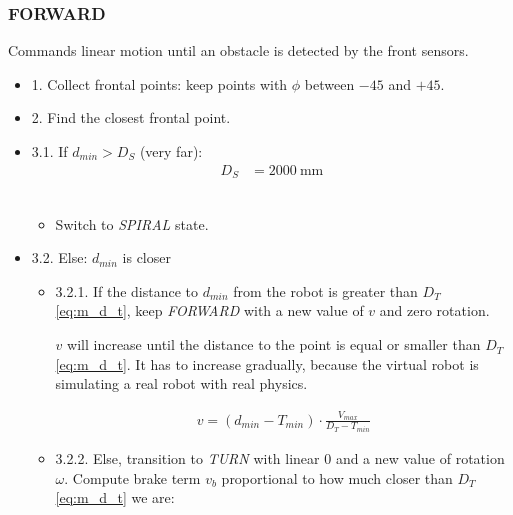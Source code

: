 \documentclass[conference]{IEEEtran}
\begin{document}
\subsubsection{FORWARD} Commands linear motion until an obstacle is detected by the front sensors.
\begin{itemize}
    \item 1. Collect frontal points: keep points with $\phi$ between $-45$\textdegree{} and $+45$\textdegree{}.
    \item 2. Find the closest frontal point.
    \item 3.1. If $d_{min} > D_S$ (very far):
    \begin{align}
        D_S &= 2000 \ \text{mm}
    \end{align} 
    \begin{itemize}
        \item Switch to \textit{SPIRAL} state.
    \end{itemize}
    \item 3.2. Else: $d_{min}$ is closer
    \begin{itemize}
        \item 3.2.1. If the distance to $d_{min}$ from the robot is greater than $D_T$ \eqref{eq:m_d_t}, keep \textit{FORWARD} with a new value of $v$ and zero rotation.

        $v$ will increase until the distance to the point is equal or smaller than $D_T$ \eqref{eq:m_d_t}. It has to increase gradually, because the virtual robot is simulating a real robot with real physics.
        
    \begin{align}
        v = (d_{min} - T_{min}) \cdot \frac{V_{max}}{D_T - T_{min}}
    \end{align}
    

        
        
        \item 3.2.2. Else, transition to \textit{TURN} with linear $0$ and a new value of rotation $\omega$.
        Compute brake term $v_b$ proportional to how much closer than $D_T$ \eqref{eq:m_d_t} we are:
        

\end{itemize}
\end{itemize}
\end{document}
